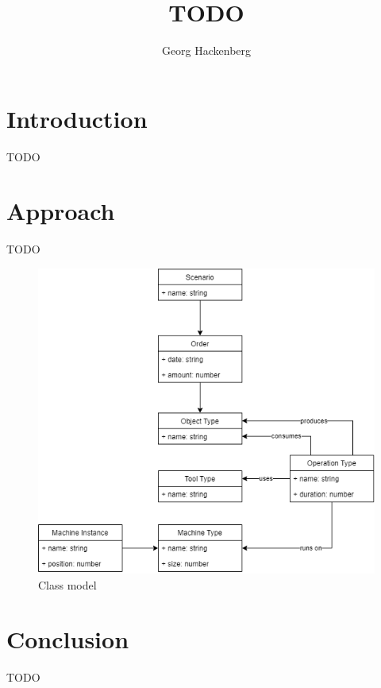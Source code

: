 \documentclass{article}
\begin{document}
    \title{TODO}
    \author{Georg Hackenberg}
    \maketitle
    
    \section{Introduction}
    \label{sec:intro}
    TODO~\cite{key}

    \section{Approach}
    \label{sec:model}
    TODO

    \begin{figure}
        \centering
        \includegraphics[width=\textwidth]{../../models/class-model.png}
        \caption{Class model}
        \label{fig:model}
    \end{figure}

    \section{Conclusion}
    \label{sec:con}
    TODO~\cite{key}

    
    
\end{document}
